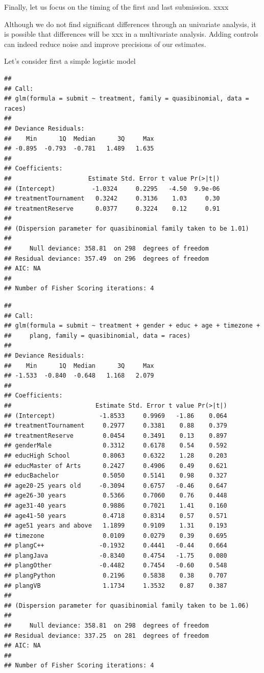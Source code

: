 \documentclass[12pt,]{article}
\begin{document}
Finally, let us focus on the timing of the first and last submission.
xxxx

Although we do not find significant differences through an univariate
analysis, it is possible that differences will be xxx in a multivariate
analysis. Adding controls can indeed reduce noise and improve precisions
of our estimates.

Let's consider first a simple logistic model

\begin{verbatim}
## 
## Call:
## glm(formula = submit ~ treatment, family = quasibinomial, data = races)
## 
## Deviance Residuals: 
##    Min      1Q  Median      3Q     Max  
## -0.895  -0.793  -0.781   1.489   1.635  
## 
## Coefficients:
##                     Estimate Std. Error t value Pr(>|t|)
## (Intercept)          -1.0324     0.2295   -4.50  9.9e-06
## treatmentTournament   0.3242     0.3136    1.03     0.30
## treatmentReserve      0.0377     0.3224    0.12     0.91
## 
## (Dispersion parameter for quasibinomial family taken to be 1.01)
## 
##     Null deviance: 358.81  on 298  degrees of freedom
## Residual deviance: 357.49  on 296  degrees of freedom
## AIC: NA
## 
## Number of Fisher Scoring iterations: 4
\end{verbatim}

\begin{verbatim}
## 
## Call:
## glm(formula = submit ~ treatment + gender + educ + age + timezone + 
##     plang, family = quasibinomial, data = races)
## 
## Deviance Residuals: 
##    Min      1Q  Median      3Q     Max  
## -1.533  -0.840  -0.648   1.168   2.079  
## 
## Coefficients:
##                       Estimate Std. Error t value Pr(>|t|)
## (Intercept)            -1.8533     0.9969   -1.86    0.064
## treatmentTournament     0.2977     0.3381    0.88    0.379
## treatmentReserve        0.0454     0.3491    0.13    0.897
## genderMale              0.3312     0.6178    0.54    0.592
## educHigh School         0.8063     0.6322    1.28    0.203
## educMaster of Arts      0.2427     0.4906    0.49    0.621
## educBachelor            0.5050     0.5141    0.98    0.327
## age20-25 years old     -0.3094     0.6757   -0.46    0.647
## age26-30 years          0.5366     0.7060    0.76    0.448
## age31-40 years          0.9886     0.7021    1.41    0.160
## age41-50 years          0.4718     0.8314    0.57    0.571
## age51 years and above   1.1899     0.9109    1.31    0.193
## timezone                0.0109     0.0279    0.39    0.695
## plangC++               -0.1932     0.4441   -0.44    0.664
## plangJava              -0.8340     0.4754   -1.75    0.080
## plangOther             -0.4482     0.7454   -0.60    0.548
## plangPython             0.2196     0.5838    0.38    0.707
## plangVB                 1.1734     1.3532    0.87    0.387
## 
## (Dispersion parameter for quasibinomial family taken to be 1.06)
## 
##     Null deviance: 358.81  on 298  degrees of freedom
## Residual deviance: 337.25  on 281  degrees of freedom
## AIC: NA
## 
## Number of Fisher Scoring iterations: 4
\end{verbatim}
\end{document}
